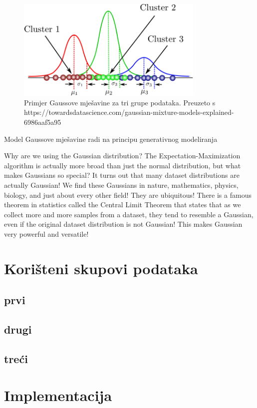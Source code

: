 \documentclass[utf8, diplomski, numeric]{fer}
\begin{document}
\begin{figure}[htb]
\includegraphics[width=0.8\textwidth]{images/gauss_mixture.png}
\centering
\caption{Primjer Gaussove mješavine za tri grupe podataka. Preuzeto s  https://towardsdatascience.com/gaussian-mixture-models-explained-6986aaf5a95}
\label{fig:gauss-mixture}
\end{figure}

Model Gaussove mješavine radi na principu generativnog modeliranja

Why are we using the Gaussian distribution? The Expectation-Maximization algorithm is actually more broad than just the normal distribution, but what makes Gaussians so special? It turns out that many dataset distributions are actually Gaussian! We find these Gaussians in nature, mathematics, physics, biology, and just about every other field! They are ubiquitous! There is a famous theorem in statistics called the Central Limit Theorem that states that as we collect more and more samples from a dataset, they tend to resemble a Gaussian, even if the original dataset distribution is not Gaussian! This makes Gaussian very powerful and versatile!

\chapter{Korišteni skupovi podataka}
\section{prvi}
\section{drugi}
\section{treći}

\chapter{Implementacija}
\end{document}
